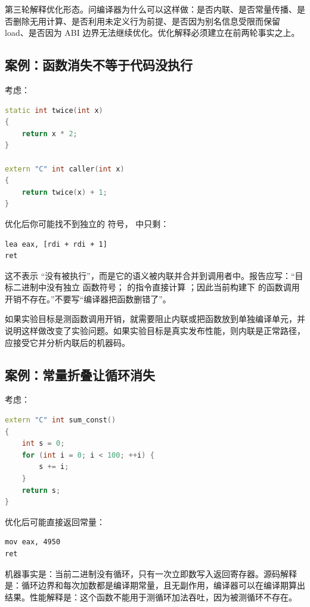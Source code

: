 第三轮解释优化形态。问编译器为什么可以这样做：是否内联、是否常量传播、是否删除无用计算、是否利用未定义行为前提、是否因为别名信息受限而保留 load、是否因为 ABI 边界无法继续优化。优化解释必须建立在前两轮事实之上。

\subsection{案例：函数消失不等于代码没执行}

考虑：

\begin{lstlisting}[language=C++]
static int twice(int x)
{
    return x * 2;
}

extern "C" int caller(int x)
{
    return twice(x) + 1;
}
\end{lstlisting}

优化后你可能找不到独立的  符号， 中只剩：

\begin{lstlisting}
lea eax, [rdi + rdi + 1]
ret
\end{lstlisting}

这不表示  “没有被执行”，而是它的语义被内联并合并到调用者中。报告应写：“目标二进制中没有独立  函数符号； 的指令直接计算 ；因此当前构建下  的函数调用开销不存在。”不要写“编译器把函数删错了”。

如果实验目标是测函数调用开销，就需要阻止内联或把函数放到单独编译单元，并说明这样做改变了实验问题。如果实验目标是真实发布性能，则内联是正常路径，应接受它并分析内联后的机器码。

\subsection{案例：常量折叠让循环消失}

考虑：

\begin{lstlisting}[language=C++]
extern "C" int sum_const()
{
    int s = 0;
    for (int i = 0; i < 100; ++i) {
        s += i;
    }
    return s;
}
\end{lstlisting}

优化后可能直接返回常量：

\begin{lstlisting}
mov eax, 4950
ret
\end{lstlisting}

机器事实是：当前二进制没有循环，只有一次立即数写入返回寄存器。源码解释是：循环边界和每次加数都是编译期常量，且无副作用，编译器可以在编译期算出结果。性能解释是：这个函数不能用于测循环加法吞吐，因为被测循环不存在。

